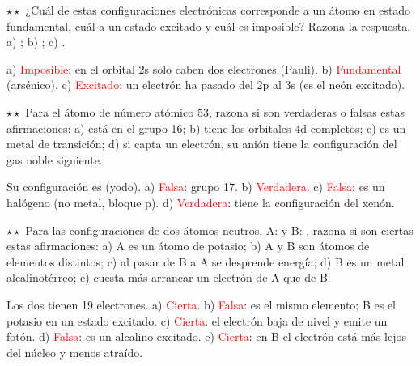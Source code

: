 \begin{exercise}
    \(\star\star\) ¿Cuál de estas configuraciones electrónicas corresponde a un átomo en estado fundamental, cuál a un estado
    excitado y cuál es imposible? Razona la respuesta. a) ; b) ;
    c) .
    \begin{solu}
        a) \textcolor{red}{Imposible}: en el orbital 2s solo caben dos electrones (Pauli). b) \textcolor{red}{Fundamental} (arsénico).
        c) \textcolor{red}{Excitado}: un electrón ha pasado del 2p al 3s (es el neón excitado).
    \end{solu}
\end{exercise}

\begin{exercise}
    \(\star\star\) Para el átomo de número atómico 53, razona si son verdaderas o falsas estas afirmaciones: a) está en el grupo 16;
    b) tiene los orbitales 4d completos; c) es un metal de transición; d) si capta un electrón, su anión tiene la configuración del
    gas noble siguiente.
    \begin{solu}
        Su configuración es  (yodo). a) \textcolor{red}{Falsa}: grupo 17. b) \textcolor{red}{Verdadera}.
        c) \textcolor{red}{Falsa}: es un halógeno (no metal, bloque p). d) \textcolor{red}{Verdadera}:  tiene la
        configuración del xenón.
    \end{solu}
\end{exercise}

\begin{exercise}
    \(\star\star\) Para las configuraciones de dos átomos neutros, A:  y
    B: , razona si son ciertas estas afirmaciones: a) A es un átomo de potasio; b) A y B son
    átomos de elementos distintos; c) al pasar de B a A se desprende energía; d) B es un metal alcalinotérreo; e) cuesta más arrancar
    un electrón de A que de B.
    \begin{solu}
        Los dos tienen 19 electrones. a) \textcolor{red}{Cierta.} b) \textcolor{red}{Falsa}: es el mismo elemento; B es el potasio en
        un estado excitado. c) \textcolor{red}{Cierta}: el electrón baja de nivel y emite un fotón. d) \textcolor{red}{Falsa}: es un
        alcalino excitado. e) \textcolor{red}{Cierta}: en B el electrón está más lejos del núcleo y menos atraído.
    \end{solu}
\end{exercise}


